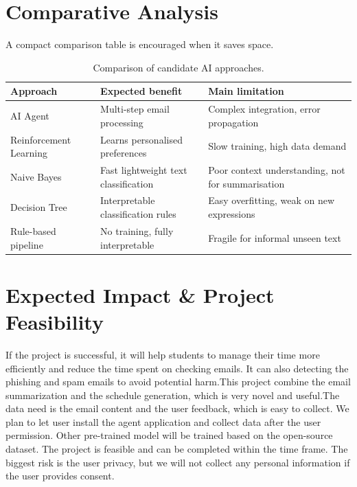 \documentclass{article}
\begin{document}
\section{Comparative Analysis}
A compact comparison table is encouraged when it saves space.
\begin{table}[ht]
\small
\centering
\setlength{\tabcolsep}{4pt}
\caption{Comparison of candidate AI approaches.}\label{tab:approach-comparison}
\begin{tabular}{l p{4.2cm} p{4.2cm}}
\toprule
Approach & Expected benefit & Main limitation \\
\midrule
AI Agent & Multi-step email processing & Complex integration, error propagation \\
Reinforcement Learning & Learns personalised preferences & Slow training, high data demand \\
Naive Bayes & Fast lightweight text classification & Poor context understanding, not for summarisation \\
Decision Tree & Interpretable classification rules & Easy overfitting, weak on new expressions \\
Rule-based pipeline & No training, fully interpretable & Fragile for informal unseen text \\
\bottomrule
\end{tabular}
\end{table}



\section{Expected Impact \& Project Feasibility}
If the project is successful, it will help students to manage their time more efficiently and reduce the time spent on checking emails. It can also detecting the phishing and spam emails to avoid potential harm.This project combine the email summarization and the schedule generation, which is very novel and useful.The data need is the email content and the user feedback, which is easy to collect. We plan to let user install the agent application and collect data after the user permission. Other pre-trained model will be trained based on the open-source dataset. The project is feasible and can be completed within the time frame. The biggest risk is the user privacy, but we will not collect any personal information if the user provides consent.




\end{document}
